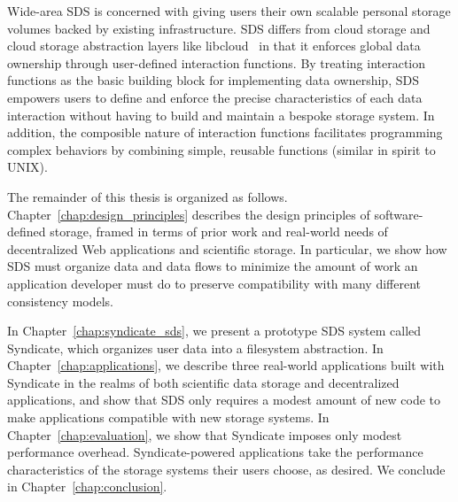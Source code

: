 Wide-area SDS is concerned with giving users their own scalable
personal storage volumes backed by existing infrastructure.  SDS differs from
cloud storage and cloud storage abstraction layers like libcloud~\cite{libcloud}
in that it enforces global data ownership through user-defined interaction functions.
By treating interaction functions as the basic building block for implementing
data ownership, SDS empowers users to define and enforce the precise
characteristics of each data interaction without having to build and
maintain a bespoke storage system.  In addition, the composible nature of
interaction functions facilitates programming
complex behaviors by combining simple, reusable functions (similar in spirit to
UNIX).

The remainder of this thesis is organized as follows.
Chapter~\ref{chap:design_principles} describes the design principles of
software-defined storage, framed in terms of prior work and real-world needs of
decentralized Web applications and scientific storage.  In particular, we show
how SDS must organize data and data flows to minimize the amount of work an
application developer must do to preserve compatibility with many different
consistency models.

In Chapter~\ref{chap:syndicate_sds}, we present a prototype SDS system called
Syndicate, which organizes user data into a filesystem abstraction.  In
Chapter~\ref{chap:applications}, we describe three real-world applications built
with Syndicate in the realms of both scientific data storage and decentralized
applications, and show that SDS only requires a modest amount of new code to
make applications compatible with new storage systems.  In
Chapter~\ref{chap:evaluation}, we show that Syndicate imposes only modest
performance overhead.  Syndicate-powered applications take the performance
characteristics of the storage systems their users choose, as desired.  We
conclude in Chapter~\ref{chap:conclusion}.

